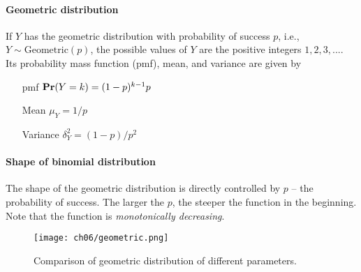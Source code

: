 \paragraph{Geometric distribution} If $Y$ has the geometric distribution with probability of success $p$, i.e., $Y \sim \mathrm{Geometric}(p)$, the possible values of $Y$ are the positive integers $1, 2, 3, ...$. Its probability mass function (pmf), mean, and variance are given by
\begin{itemize}[font=\sffamily\bfseries, leftmargin=1.95cm, style=nextline, itemsep=0cm]
\item[pmf] $\mathop{\mathbf{Pr}}(Y=k) = (1-p)^{k-1}p$
\item[Mean] $\mu_Y = 1/p$
\item[Variance] $\delta_Y^2 = (1-p)/p^2$
\end{itemize}

\paragraph{Shape of binomial distribution} The shape of the geometric distribution is directly controlled by $p$ -- the probability of success. The larger the $p$, the steeper the function in the beginning. Note that the function is \textit{monotonically decreasing}.

\begin{figure}[ht!]
    \centering
    \texttt{[image: ch06/geometric.png]}
    \caption{Comparison of geometric distribution of different parameters.}
    \label{fig:geometric}
\end{figure}

